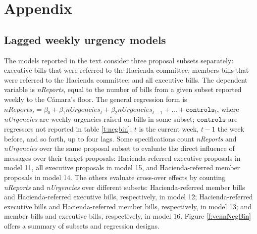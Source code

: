 \documentclass[letter,12pt]{article}
\begin{document}
%

\section{Appendix}

\subsection{Lagged weekly urgency models}

The models reported in the text consider three proposal subsets separately: executive bills that were referred to the Hacienda committee; members bills that were referred to the Hacienda committee; and all executive bills. The dependent variable is \emph{nReports}, equal to the number of bills from a given subset reported weekly to the C\'amara's floor. The general regression form is $\mathit{nReports}_t = \beta_0 + \beta_1 \mathit{nUrgencies}_t + \beta_2 \mathit{nUrgencies}_{t-1} + ... + \texttt{controls}_t$, where \emph{nUrgencies} are weekly urgencies raised on bills in some subset; $\texttt{controls}$ are regressors not reported in table \ref{t:negbin}; $t$ is the current week, $t-1$ the week before, and so forth, up to four lags. Some specifications count \emph{nReports} and \emph{nUrgencies} over the same proposal subset to evaluate the direct influence of messages over their target proposals: Hacienda-referred executive proposals in model 11, all executive proposals in model 15, and Hacienda-referred member proposals in model 14. The others evaluate cross-over effects by counting \emph{nReports} and \emph{nUrgencies} over different subsets: Hacienda-referred member bills and Hacienda-referred executive bills, respectively, in model 12; Hacienda-referred executive bills and Hacienda-referred member bills, respectively, in model 13; and member bills and executive bills, respectively, in model 16. Figure \ref{f:vennNegBin} offers a summary of subsets and regression designs. 
\end{document}
